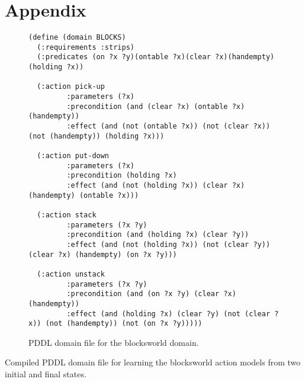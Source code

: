\section*{Appendix}
\label{sec:appendix}


\begin{figure}[hbtp!]
\begin{scriptsize}  
\begin{verbatim}
(define (domain BLOCKS)
  (:requirements :strips)
  (:predicates (on ?x ?y)(ontable ?x)(clear ?x)(handempty)(holding ?x))

  (:action pick-up
	     :parameters (?x)
	     :precondition (and (clear ?x) (ontable ?x) (handempty))
	     :effect (and (not (ontable ?x)) (not (clear ?x)) (not (handempty)) (holding ?x)))

  (:action put-down
	     :parameters (?x)
	     :precondition (holding ?x)
	     :effect (and (not (holding ?x)) (clear ?x) (handempty) (ontable ?x)))

  (:action stack
	     :parameters (?x ?y)
	     :precondition (and (holding ?x) (clear ?y))
	     :effect (and (not (holding ?x)) (not (clear ?y)) (clear ?x) (handempty) (on ?x ?y)))

  (:action unstack
	     :parameters (?x ?y)
	     :precondition (and (on ?x ?y) (clear ?x) (handempty))
	     :effect (and (holding ?x) (clear ?y) (not (clear ?x)) (not (handempty)) (not (on ?x ?y)))))
  \end{verbatim}
\end{scriptsize}  
\caption{\small PDDL domain file for the blocksworld domain.}
\label{fig:bw-domain}
\end{figure}


Compiled PDDL domain file for learning the blocksworld action models from two initial and final states.

